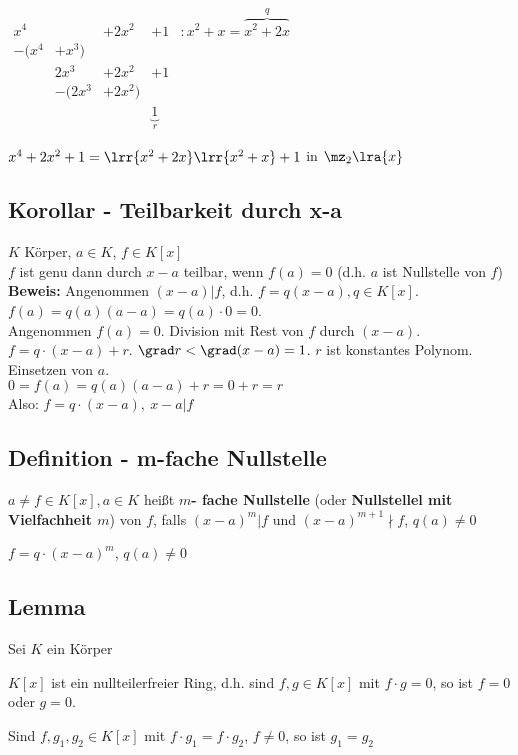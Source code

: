			$\begin{array}{rrlrl}
				x^4		&		&+2x^2	&+1		&:x^2+x=\overbrace{x^2+2x}^{q}\\
				-(x^4	&+x^3)			&\\
						&2x^3	&+2x^2	&+1\\
						&-(2x^3	&+2x^2)	&\\
						&		&		&\underbrace{1}_{r}
			\end{array}$

			$x^4+2x^2+1 =\lrr{x^2+2x}\lrr{x^2+x}+1$ in $\mz_2\lra{x}$
	\subExEnd

	\subsection{Korollar - Teilbarkeit durch x-a}

	$K$ Körper, $a\in K$, $f\in K[x]$\\
	$f$ ist genu dann durch $x-a$ teilbar, wenn $f(a)=0$ (d.h. $a$ ist Nullstelle von $f$)\\
	\textbf{Beweis:} Angenommen $(x-a)|f$, d.h. $f=q(x-a),q\in K[x]$. $f(a)=q(a)(a-a)=q(a)\cdot 0=0$.\\
	Angenommen $f(a)=0$. Division mit Rest von $f$ durch $(x-a)$.\\
	$f=q\cdot(x-a)+r$. $\grad r<\grad(x-a)=1$. $r$ ist konstantes Polynom. Einsetzen von $a$.\\
	$0=f(a)=q(a)(a-a)+r=0+r=r$\\
	Also: $f=q\cdot(x-a),\ x-a|f$

	\subsection{Definition - m-fache Nullstelle}

	$a\neq f\in K[x],a\in K$ heißt \textbf{$m$- fache Nullstelle} (oder \textbf{Nullstellel mit Vielfachheit $m$}) von $f$, falls $(x-a)^m|f$ und $(x-a)^{m+1}\nmid f$, $q(a)\neq 0$

	$f=q\cdot(x-a)^m$, $q(a)\neq 0$

	\subsection{Lemma}

	Sei $K$ ein Körper
	\item $K[x]$ ist ein nullteilerfreier Ring, d.h. sind $f,g\in K[x]$ mit $f\cdot g=0$, so ist $f=0$ oder $g=0$.
	\item Sind $f,g_1,g_2\in K[x]$ mit $f\cdot g_1=f\cdot g_2$, $f\neq 0$, so ist $g_1=g_2$
	\subExEnd

